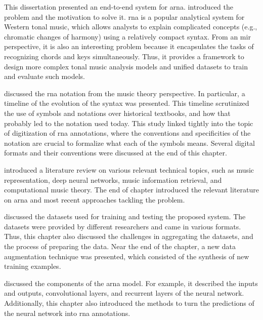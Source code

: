 
This dissertation presented an end-to-end system for
\gls{arna}.  introduced the problem
and the motivation to solve it. \gls{rna} is a popular
analytical system for Western tonal music, which allows
analysts to explain complicated concepts (e.g., chromatic
changes of harmony) using a relatively compact syntax. From
an \gls{mir} perspective, it is also an interesting problem
because it encapsulates the tasks of recognizing chords and
keys simultaneously. Thus, it provides a framework to design
more complex tonal music analysis models and unified
datasets to train and evaluate such models.

 discussed the
\gls{rna} notation from the music theory perspective. In
particular, a timeline of the evolution of the syntax was
presented. This timeline scrutinized the use of symbols and
notations over historical textbooks, and how that probably
led to the notation used today. This study linked tightly
into the topic of digitization of \gls{rna} annotations,
where the conventions and specificities of the notation are
crucial to formalize what each of the symbols means. Several
digital formats and their conventions were discussed at the
end of this chapter.

 introduced a literature review on
various relevant technical topics, such as music
representation, deep neural networks, music information
retrieval, and computational music theory. The end of
chapter introduced the relevant literature on \gls{arna} and
most recent approaches tackling the problem.

 discussed the
datasets used for training and testing the proposed system.
The datasets were provided by different researchers and came
in various formats. Thus, this chapter also discussed the
challenges in aggregating the datasets, and the process of
preparing the data. Near the end of the chapter, a new data
augmentation technique was presented, which consisted of the
synthesis of new training examples.

 discussed the components of the
\gls{arna} model. For example, it described the inputs and
outputs, convolutional layers, and recurrent layers of the
neural network. Additionally, this chapter also introduced
the methods to turn the predictions of the neural network
into \gls{rna} annotations.

